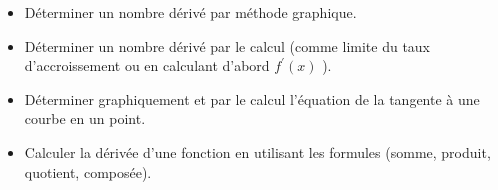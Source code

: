 \documentclass[12pt]{article}
\theoremstyle{break}
\begin{document}
\newpage
\begin{savoir}{}{}
\begin{itemize}
  \item Déterminer un nombre dérivé par méthode graphique.
  \item Déterminer un nombre dérivé par le calcul (comme limite du taux d'accroissement ou en calculant d'abord $f^{\prime}(x)$ ).
  \item Déterminer graphiquement et par le calcul l'équation de la tangente à une courbe en un point.
  \item Calculer la dérivée d'une fonction en utilisant les formules (somme, produit, quotient, composée).
\end{itemize}
\end{savoir}
\end{document}
